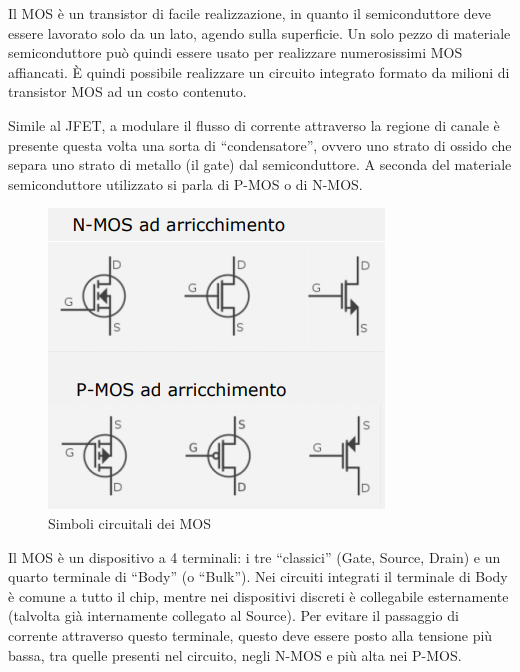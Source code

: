 \documentclass{article}
\begin{document}
Il MOS è un transistor di facile realizzazione, in quanto il semiconduttore deve essere lavorato solo da un lato, agendo sulla superficie. Un solo pezzo di materiale semiconduttore può quindi essere usato per realizzare numerosissimi MOS affiancati. È quindi possibile realizzare un circuito integrato formato da milioni di transistor MOS ad un costo contenuto.

\vspace{3mm}

Simile al JFET, a modulare il flusso di corrente attraverso la regione di canale è presente questa volta una sorta di ``condensatore'', ovvero uno strato di ossido che separa uno strato di metallo (il gate) dal semiconduttore. A seconda del materiale semiconduttore utilizzato si parla di P-MOS o di N-MOS.

\begin{figure}[h]
  \centering
  \includegraphics[width=0.4\linewidth,height=0.2\textheight]{IM_MOS_simboli}
  \caption{Simboli circuitali dei MOS}
  \label{Schema_MOS_simboli}
\end{figure}

Il MOS è un dispositivo a 4 terminali: i tre ``classici'' (Gate, Source, Drain) e un quarto terminale di ``Body'' (o ``Bulk''). Nei circuiti integrati il terminale di Body è comune a tutto il chip, mentre nei dispositivi discreti è collegabile esternamente (talvolta già internamente collegato al Source). Per evitare il passaggio di corrente attraverso questo terminale, questo deve essere posto alla tensione più bassa, tra quelle presenti nel circuito, negli N-MOS e più alta nei P-MOS.
\end{document}
